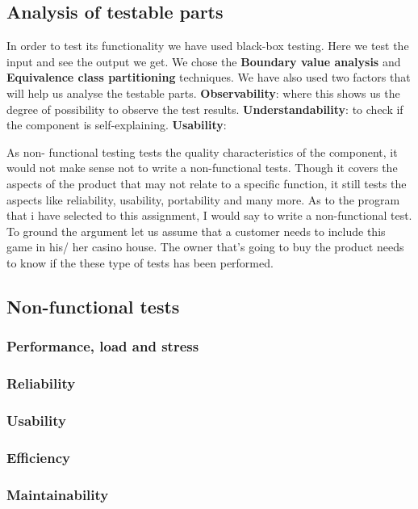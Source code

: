 \documentclass[UKenglish]{article}  %
\begin{document}
\subsection{Analysis of testable parts}
In order to test its functionality we have used black-box testing. Here we test
the input and see the output we get. We chose the \textbf{Boundary value analysis}
and \textbf{Equivalence class partitioning} techniques.
We have also used two factors that will help us analyse the testable parts.
\textbf{Observability}: where this shows us the degree of possibility to observe the
test results.
\textbf{Understandability}: to check if the component is self-explaining. 
\textbf{Usability}: 

As non- functional testing tests the quality characteristics of the component,
it would not make sense not to write a non-functional tests. 
Though it covers the aspects of the product that may not relate to a specific
function, it still tests the aspects like reliability, usability, portability
and many more. As to the program that i have selected to this assignment, I
would say to write a non-functional test. To ground the argument let us assume
that a customer needs to include this game in his/ her casino house.
The owner that’s going to buy the product needs to know  if the these type
of tests has been performed.

\subsection{Non-functional tests}

\subsubsection{Performance, load and stress}

\subsubsection{Reliability}

\subsubsection{Usability}

\subsubsection{Efficiency}

\subsubsection{Maintainability}
\end{document}
